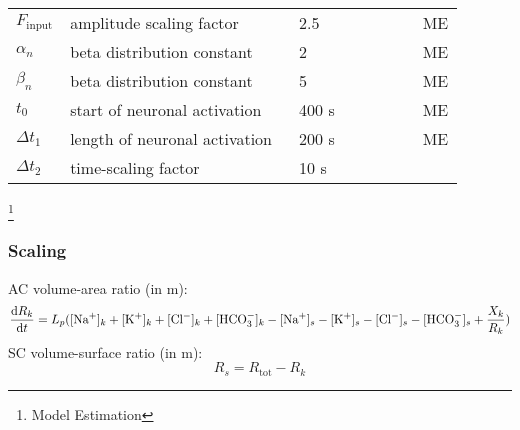 \begin{table}[h!]
\centering
\begin{tabular}{ p{0.09\linewidth}  >{\footnotesize} p{0.5\linewidth}  >{\footnotesize} p{0.27\linewidth} >{\footnotesize} p{0.03\linewidth} }
\hline
$F_{\text{input}}$ 		& amplitude scaling factor 		& 2.5 		& ME\footnotemark[1]  \\ %
$\alpha_n$ 				& beta distribution constant	& 2 		& ME  \\ %
$\beta_n$ 				& beta distribution constant	& 5 		& ME  \\ %
$t_{0}$ 				& start of neuronal activation	& 400 s 	& ME  \\
$\Delta t_1$ 			& length of neuronal activation & 200 s 	& ME  \\
$\Delta t_2$ 			& time-scaling factor			& 10 s		& \citep{Ostby2009}   \\
\hline
\end{tabular}
\end{table}
\footnote[1]{Model Estimation}

\subsubsection*{Scaling}
\gls{AC} volume-area ratio (in m):
\begin{equation} \label{eq:R_k}
	\begin{aligned}
	\dfrac{\mathrm{d}R_k}{\mathrm{d}t}= L_p([\text{Na$^+$}]_k + [\text{K$^+$}]_k + [\text{Cl$^-$}]_k + [\text{HCO$_3^-$}]_k - [\text{Na$^+$}]_s - [\text{K$^+$}]_s - [\text{Cl$^-$}]_s - [\text{HCO$_3^-$}]_s + \frac{X_k}{R_k})
	\end{aligned}
\end{equation}
%
\gls{SC} volume-surface ratio  (in m):
\begin{equation} \label{eq:R_tot}
R_s = R_{\text{tot}} - R_k  
\end{equation}


